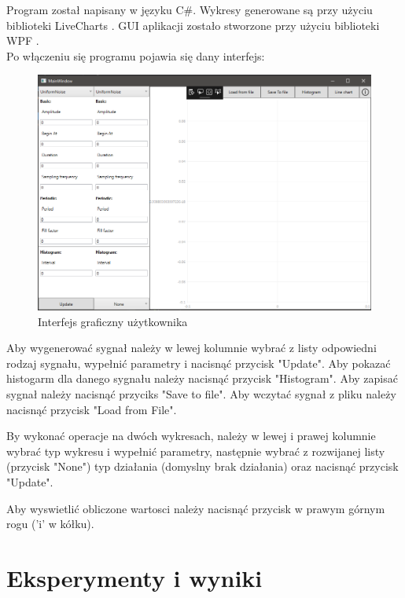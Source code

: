 \documentclass[12pt]{article}
\begin{document}
Program został napisany w języku C\#. Wykresy generowane są przy użyciu biblioteki LiveCharts \cite{lv}. GUI aplikacji zostało stworzone przy użyciu biblioteki WPF \cite{wpf}.
\\Po włączeniu się programu pojawia się dany interfejs:
\begin{figure}[H]
 \centering
 \includegraphics[width=15cm]{images/gui1.PNG}
 \vspace{-0.3cm}
 \caption{Interfejs graficzny użytkownika}
 \label{gui}
\end{figure}

Aby wygenerować sygnał należy w lewej kolumnie wybrać z listy odpowiedni rodzaj sygnału,  wypełnić parametry i nacisnąć przycisk "Update". Aby pokazać histogarm dla danego sygnału należy nacisnąć przycisk "Histogram". Aby zapisać sygnał należy nacisnąć przyciks "Save to file". Aby wczytać sygnał z pliku należy nacisnąć przycisk "Load from File".

By wykonać operacje na dwóch wykresach, należy w lewej i prawej kolumnie wybrać typ wykresu i wypełnić parametry, następnie wybrać z rozwijanej listy (przycisk "None") typ działania (domyslny brak działania) oraz nacisnąć przycisk "Update".

Aby wyswietlić obliczone wartosci należy nacisnąć przycisk w prawym górnym rogu ('i' w kółku).
\section{Eksperymenty i wyniki}


\end{document}
